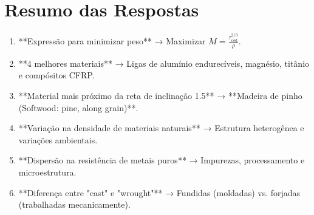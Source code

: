 \section{Resumo das Respostas}

\begin{enumerate}
    \item **Expressão para minimizar peso** → Maximizar \( M = \frac{\tau_{\text{ced}}^{2/3}}{\rho} \).
    \item **4 melhores materiais** → Ligas de alumínio endurecíveis, magnésio, titânio e compósitos CFRP.
    \item **Material mais próximo da reta de inclinação 1.5** → **Madeira de pinho (Softwood: pine, along grain)**.
    \item **Variação na densidade de materiais naturais** → Estrutura heterogênea e variações ambientais.
    \item **Dispersão na resistência de metais puros** → Impurezas, processamento e microestrutura.
    \item **Diferença entre "cast" e "wrought"** → Fundidas (moldadas) vs. forjadas (trabalhadas mecanicamente).
\end{enumerate}
